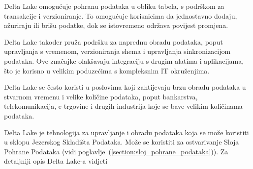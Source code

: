 Delta Lake omogućuje pohranu podataka u obliku tabela, s podrškom za transakcije
i verzioniranje. To omogućuje korisnicima da jednostavno dodaju, ažuriraju ili
brišu podatke, dok se istovremeno održava povijest promjena.

Delta Lake također pruža podršku za naprednu obradu podataka, poput upravljanja
s vremenom, verzioniranja shema i upravljanja sinkronizacijom podataka. Ove
značajke olakšavaju integraciju s drugim alatima i aplikacijama, što je korisno
u velikim poduzećima s kompleksnim IT okruženjima.

Delta Lake se često koristi u poslovima koji zahtijevaju brzu obradu podataka u
stvarnom vremenu i velike količine podataka, poput bankarstva, telekomunikacija,
e-trgovine i drugih industrija koje se bave velikim količinama podataka.

Delta Lake je tehnologija za upravljanje i obradu podataka koja se može
koristiti u sklopu Jezerskog Skladišta Podataka. Može se koristiti za
ostvarivanje Sloja Pohrane Podataka (vidi
poglavlje~(\ref{section:sloj_pohrane_podataka})). Za detaljniji opis Delta
Lake-a vidjeti
\citep{deltalake2023}
